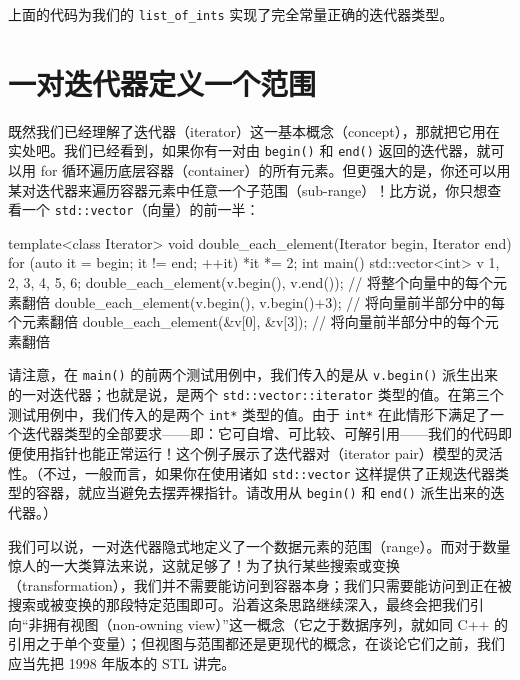 上面的代码为我们的 \texttt{list\_\allowbreak{}of\_\allowbreak{}ints} 实现了完全常量正确的迭代器类型。

\section{一对迭代器定义一个范围}

既然我们已经理解了迭代器（iterator）这一基本概念（concept），那就把它用在实处吧。我们已经看到，如果你有一对由 \texttt{begin(\allowbreak{})\allowbreak{}} 和 \texttt{end(\allowbreak{})\allowbreak{}} 返回的迭代器，就可以用 for 循环遍历底层容器（container）的所有元素。但更强大的是，你还可以用某对迭代器来遍历容器元素中任意一个子范围（sub-range）！比方说，你只想查看一个 \texttt{std::\allowbreak{}vector}（向量）的前一半：

\begin{codebox}[cpp]
    template<class Iterator>
    void double_each_element(Iterator begin, Iterator end)
    {
      for (auto it = begin; it != end; ++it) {
        *it *= 2;
      }
    }
    int main()
    {
      std::vector<int> v {1, 2, 3, 4, 5, 6};
      double_each_element(v.begin(), v.end());
        // 将整个向量中的每个元素翻倍
      double_each_element(v.begin(), v.begin()+3);
        // 将向量前半部分中的每个元素翻倍
      double_each_element(&v[0], &v[3]);
        // 将向量前半部分中的每个元素翻倍
    }
\end{codebox}

请注意，在 \texttt{main(\allowbreak{})\allowbreak{}} 的前两个测试用例中，我们传入的是从 \texttt{v.\allowbreak{}begin(\allowbreak{})\allowbreak{}} 派生出来的一对迭代器；也就是说，是两个 \texttt{std::\allowbreak{}vector::\allowbreak{}iterator} 类型的值。在第三个测试用例中，我们传入的是两个 \texttt{int*} 类型的值。由于 \texttt{int*} 在此情形下满足了一个迭代器类型的全部要求——即：它可自增、可比较、可解引用——我们的代码即便使用指针也能正常运行！这个例子展示了迭代器对（iterator pair）模型的灵活性。（不过，一般而言，如果你在使用诸如 \texttt{std::\allowbreak{}vector} 这样提供了正规迭代器类型的容器，就应当避免去摆弄裸指针。请改用从 \texttt{begin(\allowbreak{})\allowbreak{}} 和 \texttt{end(\allowbreak{})\allowbreak{}} 派生出来的迭代器。）

我们可以说，一对迭代器隐式地定义了一个数据元素的范围（range）。而对于数量惊人的一大类算法来说，这就足够了！为了执行某些搜索或变换（transformation），我们并不需要能访问到容器本身；我们只需要能访问到正在被搜索或被变换的那段特定范围即可。沿着这条思路继续深入，最终会把我们引向“非拥有视图（non-owning view）”这一概念（它之于数据序列，就如同 C++ 的引用之于单个变量）；但视图与范围都还是更现代的概念，在谈论它们之前，我们应当先把 1998 年版本的 STL 讲完。

